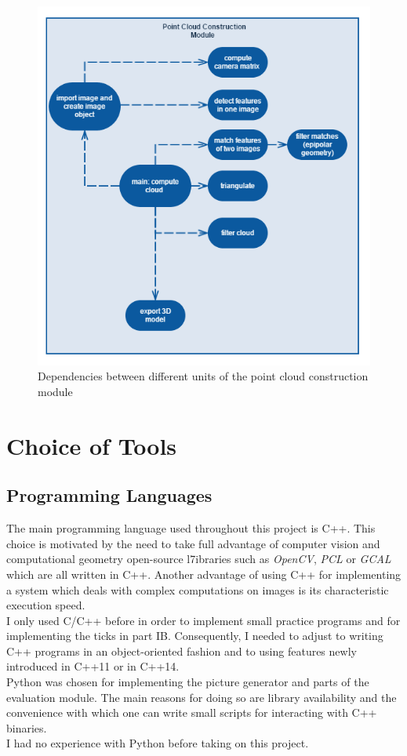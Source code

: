 \documentclass[12pt,a4paper,twoside,openright]{report}
\begin{document}
\begin{figure}
\centerline{\includegraphics[scale=0.75]{figs/dependencies.png}}
\caption{Dependencies between different units of the point cloud construction module}
\end{figure}


\section{Choice of Tools}

\subsection{Programming Languages}
The main programming language used throughout this project is C++. This choice is motivated by the need to take full advantage of computer vision and computational geometry open-source l7ibraries such as \emph{OpenCV}, \emph{PCL} or \emph{GCAL} which are all written in C++. Another advantage of using C++ for implementing a system which deals with complex computations on images is its characteristic execution speed.\\
I only used C/C++ before in order to implement small practice programs and for implementing the ticks in part IB. Consequently, I needed to adjust to writing C++ programs in an object-oriented fashion and to using features newly introduced in C++11 or in C++14.\\
\linebreak
Python was chosen for implementing the picture generator and parts of the evaluation module. The main reasons for doing so are library availability and the convenience with which one can write small scripts for interacting with C++ binaries.\\
I had no experience with Python before taking on this project.   
\end{document}
